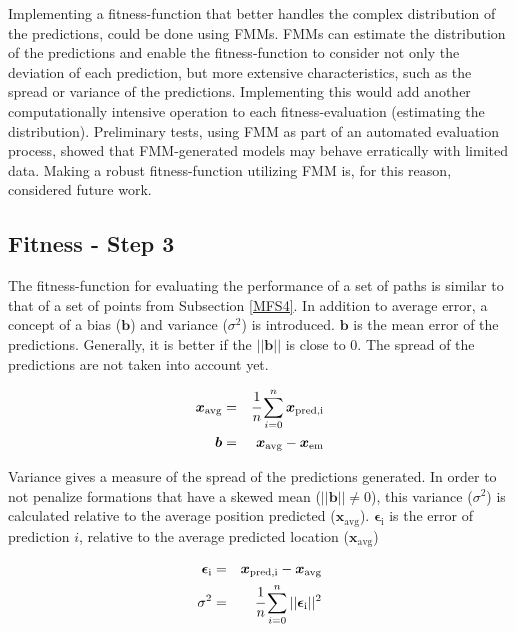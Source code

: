 \documentclass[10pt,a4paper]{book}
\begin{document}
Implementing a fitness-function that better handles the complex distribution of the predictions, could be done using \glspl{FMM}. \Glspl{FMM} can estimate the distribution of the predictions and enable the fitness-function to consider not only the deviation of each prediction, but more extensive characteristics, such as the spread or variance of the predictions. Implementing this would add another computationally intensive operation to each fitness-evaluation (estimating the distribution). Preliminary tests, using \gls{FMM} as part of an automated evaluation process, showed that \gls{FMM}-generated models may behave erratically with limited data. Making a robust fitness-function utilizing \gls{FMM} is, for this reason, considered future work.

\newpage
\subsection{Fitness - Step 3}
\label{MFS3}


The fitness-function for evaluating the performance of a set of paths is similar to that of a set of points from Subsection \ref{MFS4}. In addition to average error, a concept of a bias ($\boldsymbol{b}$) and variance ($\sigma^2$) is introduced. $\boldsymbol{b}$ is the mean error of the predictions. Generally, it is better if the $||\boldsymbol{b}||$ is close to $0$. The spread of the predictions are not taken into account yet.

\begin{eqnarray}
\boldsymbol{x}_\text{avg} &=& \cfrac{1}{n} \sum_{i=0}^{n} \boldsymbol{x}_\text{pred,i}\nonumber \\
\boldsymbol{b} &=& \boldsymbol{x}_\text{avg} - \boldsymbol{x}_\text{em} \nonumber 
\end{eqnarray}


Variance gives a measure of the spread of the predictions generated. In order to not penalize formations that have a skewed mean ($||\boldsymbol{b}|| \neq 0$), this variance ($\sigma^2$) is calculated relative to the average position predicted ($\boldsymbol{x}_\text{avg}$).  $\boldsymbol{\epsilon}_\text{i}$ is the error of prediction $i$, relative to the average predicted location ($\boldsymbol{x}_\text{avg}$) 


\begin{eqnarray}
\boldsymbol{\epsilon}_\text{i} &=& \boldsymbol{x}_\text{pred,i} - \boldsymbol{x}_\text{avg} \nonumber \\
\sigma^2 &=& \cfrac{1}{n} \sum_{i=0}^{n} ||\boldsymbol{\epsilon}_\text{i} || ^2 \nonumber
\end{eqnarray}
\end{document}
